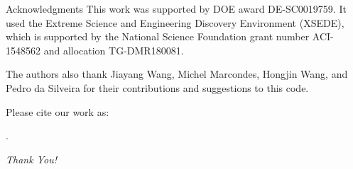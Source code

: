 \begin{frame}{Acknowledgments}
    This work was supported by DOE award DE-SC0019759. It used the Extreme
    Science and Engineering Discovery Environment (XSEDE), which is supported by
    the National Science Foundation grant number ACI-1548562 and allocation
    TG-DMR180081.

    The authors also thank Jiayang Wang, Michel Marcondes, Hongjin Wang, and Pedro da Silveira
    for their contributions and suggestions to this code.

    Please cite our work as:

    \cite{zhang2021textttexpress}.
\end{frame}

\begin{frame}[c]
    \centering \fontsize{40}{50}\selectfont\emph{Thank You!}
\end{frame}
